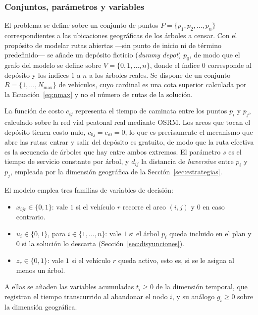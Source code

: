 \subsubsection*{Conjuntos, parámetros y variables}

El problema se define sobre un conjunto de puntos
$P = \{p_1, p_2, \ldots, p_n\}$ correspondientes a las ubicaciones geográficas
de los árboles a censar. Con el propósito de modelar rutas abiertas ---sin punto de inicio ni de
término predefinido--- se añade un depósito ficticio (\textit{dummy depot})
$p_0$, de modo que el grafo del modelo se define sobre
$V = \{0, 1, \ldots, n\}$, donde el índice $0$ corresponde al depósito y los
índices $1$ a $n$ a los árboles reales. Se dispone de un conjunto
$R = \{1, \ldots, N_{\max}\}$ de vehículos, cuyo cardinal es una cota superior
calculada por la Ecuación~\ref{eq:nmax} y no el número de rutas de la solución.

La función de costo $c_{ij}$ representa el tiempo de caminata entre los
puntos $p_i$ y $p_j$, calculado sobre la red vial peatonal real mediante OSRM. Los
arcos que tocan el depósito tienen costo nulo, $c_{0j} = c_{i0} = 0$, lo que es
precisamente el mecanismo que abre las rutas: entrar y salir del depósito es
gratuito, de modo que la ruta efectiva es la secuencia de árboles que hay entre
ambos extremos. El parámetro $s$ es el tiempo de servicio constante por árbol, y
$d_{ij}$ la distancia de \textit{haversine} entre $p_i$ y $p_j$, empleada por la
dimensión geográfica de la Sección~\ref{sec:estrategias}.

El modelo emplea tres familias de variables de decisión:

\begin{itemize}
  \item $x_{ijr} \in \{0,1\}$: vale $1$ si el vehículo $r$ recorre el arco
        $(i,j)$ y $0$ en caso contrario.
  \item $u_i \in \{0,1\}$, para $i \in \{1,\ldots,n\}$: vale $1$ si el árbol $p_i$
        queda incluido en el plan y $0$ si la solución lo descarta
        (Sección~\ref{sec:disyunciones}).
  \item $z_r \in \{0,1\}$: vale $1$ si el vehículo $r$ queda activo, esto es, si
        se le asigna al menos un árbol.
\end{itemize}

A ellas se añaden las variables acumuladas $t_i \geq 0$ de la dimensión temporal,
que registran el tiempo transcurrido al abandonar el nodo $i$, y su análogo
$g_i \geq 0$ sobre la dimensión geográfica.

